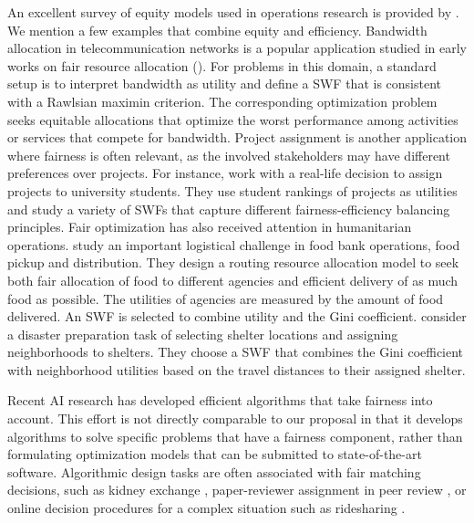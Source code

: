\documentclass{article}[11pt]
\begin{document}
An excellent survey of equity models used in operations research is provided by \cite{Karsu2015}. We mention a few examples that combine equity and efficiency.  Bandwidth allocation in telecommunication networks is a popular application studied in early works on fair resource allocation (\cite{luss1999equitable,ogryczak2002equitable,Ogryczak2008}). For problems in this domain, a standard setup is to interpret bandwidth as utility and define a SWF that is consistent with a Rawlsian maximin criterion.  The corresponding optimization problem seeks equitable allocations that optimize the worst performance among activities or services that compete for bandwidth. 
Project assignment is another application where fairness is often relevant, as the involved stakeholders may have different preferences over projects. For instance, \cite{chiarandini2019handling} work with a real-life decision to assign projects to university students. They use student rankings of projects as utilities and study a variety of SWFs that capture different fairness-efficiency balancing principles. 
Fair optimization has also received attention in humanitarian operations. \cite{EisTzu19} study an important logistical challenge in food bank operations, food pickup and distribution. They design a routing resource allocation model to seek both fair allocation of food to different agencies and efficient delivery of as much food as possible. The utilities of agencies are measured by the amount of food delivered.  An SWF is selected to combine utility and the Gini coefficient.  \cite{Sibel2019inequity} consider a disaster preparation task of selecting shelter locations and assigning neighborhoods to shelters. They choose a SWF that combines the Gini coefficient with neighborhood utilities based on the travel distances to their assigned shelter. 

Recent AI research has developed efficient algorithms that take fairness into account. This effort is not directly comparable to our proposal in that it develops algorithms to solve specific problems that have a fairness component, rather than formulating optimization models that can be submitted to state-of-the-art software.  Algorithmic design tasks are often associated with fair matching decisions, such as kidney exchange \cite{McElfresh2018}, paper-reviewer assignment in peer review \cite{SteShaSin2018}, or online decision procedures for a complex situation such as ridesharing \cite{nanda2020balancing}. 
\end{document}
